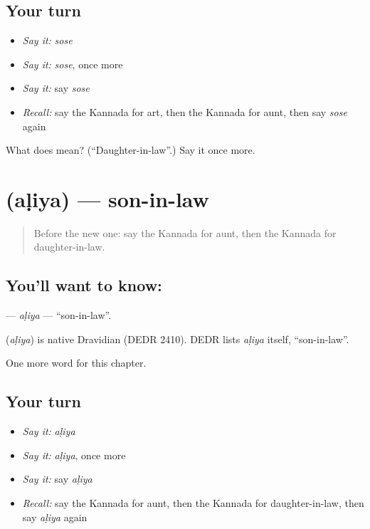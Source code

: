 \subsection*{Your turn}
\begin{itemize}
\raggedright
  \item \emph{Say it:} \emph{sose}
  \item \emph{Say it:} \emph{sose}, once more
  \item \emph{Say it:} say \emph{sose}
  \item \emph{Recall:} say the Kannada for art, then the Kannada for aunt, then say \emph{sose} again
\end{itemize}

\begin{tcolorbox}[breakable,colback=teal!4,colframe=teal!35!black,title={Before you move on}]
What does  mean? (\textquotedblleft{}Daughter-in-law\textquotedblright{}.) Say it once more.
\end{tcolorbox}
\section[\texorpdfstring{\kn{ಅಳಿಯ} (aḷiya)}{ಅಳಿಯ (aḷiya)}]{ (aḷiya) — son-in-law}

\label{lesson:KA-C226-aliya}



\begin{quote}
Before the new one: say the Kannada for aunt, then the Kannada for daughter-in-law.
\end{quote}

\subsection*{You'll want to know: }
\textbf{} — \emph{aḷiya} — \textquotedblleft{}son-in-law\textquotedblright{}.

\begin{cousinweb}
\textbf{} (\emph{aḷiya}) is native Dravidian (DEDR 2410). DEDR lists \emph{aḷiya} itself, \textquotedblleft{}son-in-law\textquotedblright{}.
\end{cousinweb}

\begin{grammarlens}[title={What you've built}]
One more word for this chapter.
\end{grammarlens}

\subsection*{Your turn}
\begin{itemize}
\raggedright
  \item \emph{Say it:} \emph{aḷiya}
  \item \emph{Say it:} \emph{aḷiya}, once more
  \item \emph{Say it:} say \emph{aḷiya}
  \item \emph{Recall:} say the Kannada for aunt, then the Kannada for daughter-in-law, then say \emph{aḷiya} again
\end{itemize}

